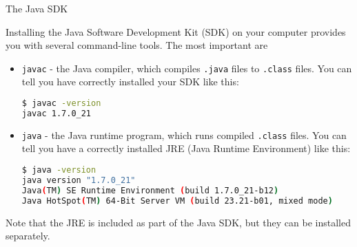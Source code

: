 \documentclass{beamer}
\begin{document}

\begin{frame}[fragile]{The Java SDK}


Installing the Java Software Development Kit (SDK) on your computer provides you with several command-line tools.  The most important are

\begin{itemize}
\item {\tt javac} - the Java compiler, which compiles {\tt .java} files to {\tt .class} files.  You can tell you have correctly installed your SDK like this:
\begin{lstlisting}[language=bash]
$ javac -version
javac 1.7.0_21
\end{lstlisting}
\item {\tt java} - the Java runtime program, which runs compiled {\tt .class} files.  You can tell you have a correctly installed JRE (Java Runtime Environment) like this:
\begin{lstlisting}[language=bash]
$ java -version
java version "1.7.0_21"
Java(TM) SE Runtime Environment (build 1.7.0_21-b12)
Java HotSpot(TM) 64-Bit Server VM (build 23.21-b01, mixed mode)
\end{lstlisting}

\end{itemize}

Note that the JRE is included as part of the Java SDK, but they can be installed separately.

\end{frame}
\end{document}
